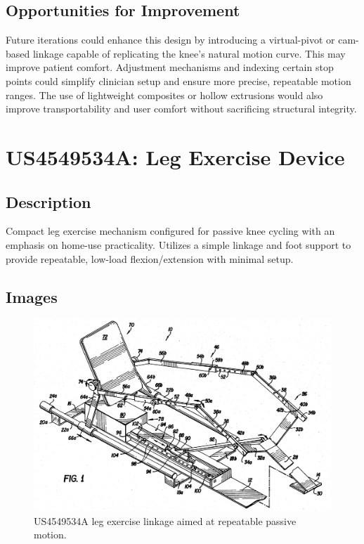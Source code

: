 \documentclass[11pt]{article}
\begin{document}
\subsection{Opportunities for Improvement}
Future iterations could enhance this design by introducing a virtual-pivot or cam-based linkage capable of replicating the knee's natural motion curve. This may improve patient comfort. Adjustment mechanisms and indexing certain stop points could simplify clinician setup and ensure more precise, repeatable motion ranges. The use of lightweight composites or hollow extrusions would also improve transportability and user comfort without sacrificing structural integrity.

\section{US4549534A: Leg Exercise Device}
\subsection{Description}
Compact leg exercise mechanism configured for passive knee cycling with an emphasis on home-use practicality. Utilizes a simple linkage and foot support to provide repeatable, low-load flexion/extension with minimal setup.
\subsection{Images}
\begin{figure}[H]
  \centering
  \includegraphics[width=0.54\linewidth]{US4549534.png}
  \caption{US4549534A leg exercise linkage aimed at repeatable passive motion.}
  \label{fig:US4549534A}
\end{figure}
\end{document}
